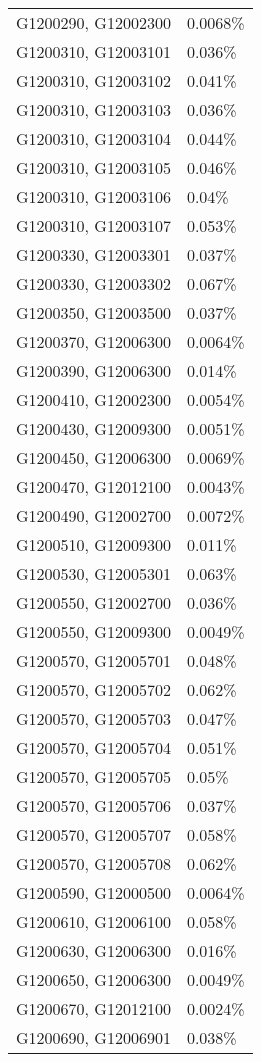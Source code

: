 \begin{longtable}[]{@{}ll@{}}
G1200290, G12002300 & 0.0068\% \\
G1200310, G12003101 & 0.036\% \\
G1200310, G12003102 & 0.041\% \\
G1200310, G12003103 & 0.036\% \\
G1200310, G12003104 & 0.044\% \\
G1200310, G12003105 & 0.046\% \\
G1200310, G12003106 & 0.04\% \\
G1200310, G12003107 & 0.053\% \\
G1200330, G12003301 & 0.037\% \\
G1200330, G12003302 & 0.067\% \\
G1200350, G12003500 & 0.037\% \\
G1200370, G12006300 & 0.0064\% \\
G1200390, G12006300 & 0.014\% \\
G1200410, G12002300 & 0.0054\% \\
G1200430, G12009300 & 0.0051\% \\
G1200450, G12006300 & 0.0069\% \\
G1200470, G12012100 & 0.0043\% \\
G1200490, G12002700 & 0.0072\% \\
G1200510, G12009300 & 0.011\% \\
G1200530, G12005301 & 0.063\% \\
G1200550, G12002700 & 0.036\% \\
G1200550, G12009300 & 0.0049\% \\
G1200570, G12005701 & 0.048\% \\
G1200570, G12005702 & 0.062\% \\
G1200570, G12005703 & 0.047\% \\
G1200570, G12005704 & 0.051\% \\
G1200570, G12005705 & 0.05\% \\
G1200570, G12005706 & 0.037\% \\
G1200570, G12005707 & 0.058\% \\
G1200570, G12005708 & 0.062\% \\
G1200590, G12000500 & 0.0064\% \\
G1200610, G12006100 & 0.058\% \\
G1200630, G12006300 & 0.016\% \\
G1200650, G12006300 & 0.0049\% \\
G1200670, G12012100 & 0.0024\% \\
G1200690, G12006901 & 0.038\% \\

\end{longtable}
